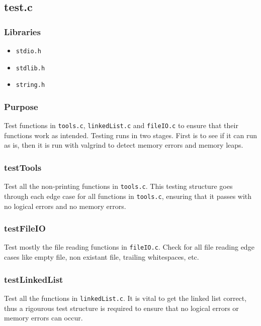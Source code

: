 \documentclass[a4paper, 12pt, titlepage]{article}
\newcommand{\code}[1]{\small\texttt{#1}\normalsize}
\begin{document}
\pagebreak
\subsection{test.c}
\subsubsection{Libraries}

\begin{itemize}[label={--}, noitemsep]
    \item \code{stdio.h}
    \item \code{stdlib.h}
    \item \code{string.h}
\end{itemize}

\subsubsection{Purpose}

Test functions in \code{tools.c}, \code{linkedList.c} and \code{fileIO.c} to
ensure that their functions work as intended. Testing runs in two stages.
First is to see if it can run as is, then it is run with valgrind to detect
memory errors and memory leaps.

\subsubsection{testTools}

Test all the non-printing functions in \code{tools.c}. This testing structure
goes through each edge case for all functions in \code{tools.c}, ensuring
that it passes with no logical errors and no memory errors.

\subsubsection{testFileIO}

Test mostly the file reading functions in \code{fileIO.c}. Check for all
file reading edge cases like empty file, non existant file, trailing
whitespaces, etc.

\subsubsection{testLinkedList}

Test all the functions in \code{linkedList.c}. It is vital to get the linked
list correct, thus a rigourous test structure is required to ensure that no
logical errors or memory errors can occur.
\end{document}
